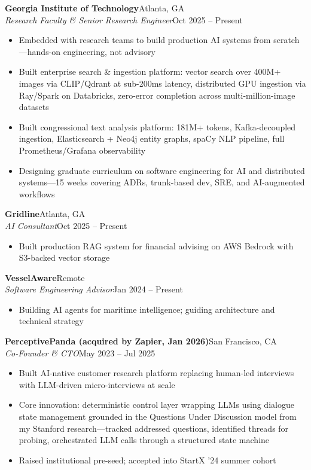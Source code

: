 \documentclass[9pt,letterpaper]{extarticle}
\newcommand{\entry}[4]{%
  \noindent\textbf{\color{dark}#1}\hfill\textcolor{ltgray}{\small #2}\\[-0.1em]
  \textit{\color{medgray}#3}\hfill\textcolor{ltgray}{\small #4}\par
}
\begin{document}
\entry{Georgia Institute of Technology}{Atlanta, GA}
      {Research Faculty \& Senior Research Engineer}{Oct 2025 -- Present}
\begin{itemize}
  \item Embedded with research teams to build production AI systems from scratch---hands-on engineering, not advisory
  \item Built enterprise search \& ingestion platform: vector search over 400M+ images via CLIP/Qdrant at sub-200ms latency, distributed GPU ingestion via Ray/Spark on Databricks, zero-error completion across multi-million-image datasets
  \item Built congressional text analysis platform: 181M+ tokens, Kafka-decoupled ingestion, Elasticsearch + Neo4j entity graphs, spaCy NLP pipeline, full Prometheus/Grafana observability
  \item Designing graduate curriculum on software engineering for AI and distributed systems---15 weeks covering ADRs, trunk-based dev, SRE, and AI-augmented workflows
\end{itemize}

\vspace{0.1em}

\entry{Gridline}{Atlanta, GA}
      {AI Consultant}{Oct 2025 -- Present}
\begin{itemize}
  \item Built production RAG system for financial advising on AWS Bedrock with S3-backed vector storage
\end{itemize}

\vspace{0.1em}

\entry{VesselAware}{Remote}
      {Software Engineering Advisor}{Jan 2024 -- Present}
\begin{itemize}
  \item Building AI agents for maritime intelligence; guiding architecture and technical strategy
\end{itemize}

\vspace{0.1em}

\entry{PerceptivePanda \textnormal{\textcolor{ltgray}{\small(acquired by Zapier, Jan 2026)}}}{San Francisco, CA}
      {Co-Founder \& CTO}{May 2023 -- Jul 2025}
\begin{itemize}
  \item Built AI-native customer research platform replacing human-led interviews with LLM-driven micro-interviews at scale
  \item Core innovation: deterministic control layer wrapping LLMs using dialogue state management grounded in the Questions Under Discussion model from my Stanford research---tracked addressed questions, identified threads for probing, orchestrated LLM calls through a structured state machine
  \item Raised institutional pre-seed; accepted into StartX '24 summer cohort
\end{itemize}
\end{document}
